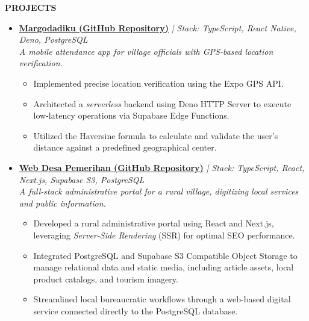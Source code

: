 \documentclass[a4paper]{article}
\newcommand{\resumesection}[1]{
    \vspace*{-0.5\baselineskip}
    \begin{flushleft}
        \large{\textbf{\uppercase{#1}}}
    \end{flushleft}
} %
\newcommand{\project}[4]{\item \textbf{#1} \textit{| Stack: #4} \\ \smallskip \textit{#2} \vspace{2pt} #3}
\newcommand{\customitemizespacing}{\addtolength{\itemsep}{-0.5\baselineskip}}
\begin{document}
\resumesection{Projects}
\begin{itemize}
    \project{\href{https://github.com/faiq1818/margodadiku}{Margodadiku (GitHub Repository)}}
		{A mobile attendance app for village officials with GPS-based location verification.}
		{
			\begin{itemize}
				\customitemizespacing
				\item Implemented precise location verification using the Expo GPS API.
				\item Architected a \textit{serverless} backend using Deno HTTP Server to execute low-latency operations via Supabase Edge Functions.
				\item Utilized the Haversine formula to calculate and validate the user's distance against a predefined geographical center.
			\end{itemize}
		}
		{TypeScript, React Native, Deno, PostgreSQL}

    \project{\href{https://github.com/faiq1818/web-desa-pemerihan}{Web Desa Pemerihan (GitHub Repository)}}
		{A full-stack administrative portal for a rural village, digitizing local services and public information.}
		{
			\begin{itemize}
				\customitemizespacing
				\item Developed a rural administrative portal using React and Next.js, leveraging \textit{Server-Side Rendering} (SSR) for optimal SEO performance.
				\item Integrated PostgreSQL and Supabase S3 Compatible Object Storage to manage relational data and static media, including article assets, local product catalogs, and tourism imagery.
				\item Streamlined local bureaucratic workflows through a web-based digital service connected directly to the PostgreSQL database.
			\end{itemize}
		}
		{TypeScript, React, Next.js, Supabase S3, PostgreSQL}
\end{itemize}
\end{document}
